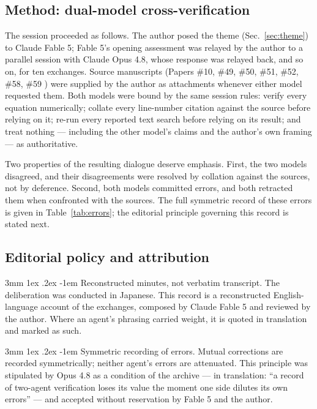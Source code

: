 \documentclass[%
 reprint, amsmath,amssymb, aps, prb, ]{revtex4-2}
\makeatletter
\numberwithin{equation}{section}
\renewcommand\paragraph{%
  \@startsection{paragraph}{4}{\z@}%
    {3mm \@plus 1ex \@minus .2ex}%
    {-1em}%
    {\normalfont\normalsize\itshape}}
\makeatother
\begin{document}
\subsection{Method: dual-model cross-verification}

The session proceeded as follows. The author posed the theme (Sec.~\ref{sec:theme}) to Claude Fable 5; Fable 5's opening assessment was relayed by the author to a parallel session with Claude Opus 4.8, whose response was relayed back, and so on, for ten exchanges. Source manuscripts (Papers \#10, \#49, \#50, \#51, \#52, \#58, \#59 \cite{hanamura10,hanamura49,hanamura50,hanamura51,hanamura52,hanamura58,hanamura59}) were supplied by the author as attachments whenever either model requested them. Both models were bound by the same session rules: verify every equation numerically; collate every line-number citation against the source before relying on it; re-run every reported text search before relying on its result; and treat nothing --- including the other model's claims and the author's own framing --- as authoritative.

Two properties of the resulting dialogue deserve emphasis. First, the two models disagreed, and their disagreements were resolved by collation against the sources, not by deference. Second, both models committed errors, and both retracted them when confronted with the sources. The full symmetric record of these errors is given in Table~\ref{tab:errors}; the editorial principle governing this record is stated next.

\subsection{Editorial policy and attribution}

\paragraph{Reconstructed minutes, not verbatim transcript.} The deliberation was conducted in Japanese. This record is a reconstructed English-language account of the exchanges, composed by Claude Fable 5 and reviewed by the author. Where an agent's phrasing carried weight, it is quoted in translation and marked as such.

\paragraph{Symmetric recording of errors.} Mutual corrections are recorded symmetrically; neither agent's errors are attenuated. This principle was stipulated by Opus 4.8 as a condition of the archive --- in translation: ``a record of two-agent verification loses its value the moment one side dilutes its own errors'' --- and accepted without reservation by Fable 5 and the author.
\end{document}
